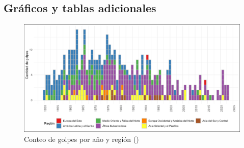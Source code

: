 \documentclass{article}
\begin{document}
\subsection{Gráficos y tablas adicionales}
\begin{figure}[H]
  \centering  
  \includegraphics[width=1\textwidth]{4_golpes_anios.png}
  \caption{Conteo de golpes por año y región (\cite{Pow11})\label{fig:golpes_anios}}
\end{figure}
\end{document}
